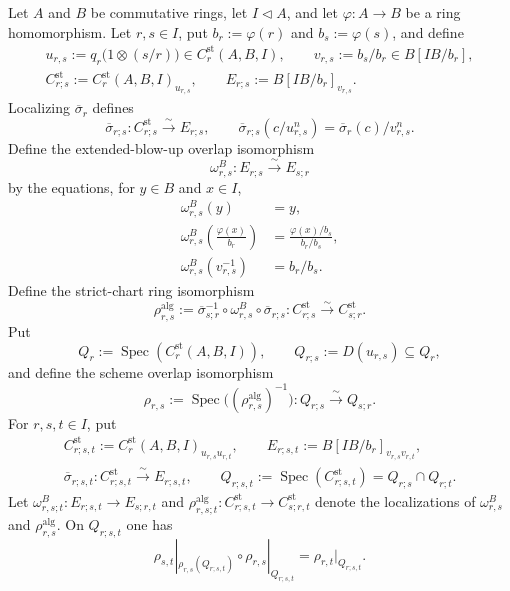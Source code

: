 \begin{lemma}
  \label{lemma:nagata-strict-transform-chart-cocycle}
  \lean{}

  Let $A$ and $B$ be commutative rings, let $I\triangleleft A$, and let
  \(\varphi\colon A\to B\) be a ring homomorphism.
  Let $r,s\in I$, put $b_r:=\varphi(r)$ and $b_s:=\varphi(s)$, and define
  \[
  \begin{gathered}
    u_{r,s}:=q_r\bigl(1\otimes(s/r)\bigr)
      \in C_r^{\mathrm{st}}(A,B,I),\qquad
    v_{r,s}:=b_s/b_r\in B[IB/b_r],\\
    C^{\mathrm{st}}_{r;s}:=
      C_r^{\mathrm{st}}(A,B,I)_{u_{r,s}},\qquad
    E_{r;s}:=B[IB/b_r]_{v_{r,s}}.
  \end{gathered}
  \]
  Localizing $\overline\sigma_r$ defines
  \[
    \overline\sigma_{r;s}\colon
      C^{\mathrm{st}}_{r;s}\xrightarrow{\sim}E_{r;s},
    \qquad
    \overline\sigma_{r;s}(c/u_{r,s}^n)
      =\overline\sigma_r(c)/v_{r,s}^n.
  \]
  Define the extended-blow-up overlap isomorphism
  \[
    \omega^B_{r,s}\colon E_{r;s}\xrightarrow{\sim}E_{s;r}
  \]
  by the equations, for $y\in B$ and $x\in I$,
  \[
  \begin{aligned}
    \omega^B_{r,s}(y)&=y,\\
    \omega^B_{r,s}\!\left(\frac{\varphi(x)}{b_r}\right)
      &=\frac{\varphi(x)/b_s}{b_r/b_s},\\
    \omega^B_{r,s}(v_{r,s}^{-1})&=b_r/b_s.
  \end{aligned}
  \]
  Define the strict-chart ring isomorphism
  \[
    \rho^{\mathrm{alg}}_{r,s}:=
      \overline\sigma_{s;r}^{-1}\circ\omega^B_{r,s}
        \circ\overline\sigma_{r;s}
      \colon C^{\mathrm{st}}_{r;s}\xrightarrow{\sim}
        C^{\mathrm{st}}_{s;r}.
  \]
  Put
  \[
    Q_r:=\operatorname{Spec}(C_r^{\mathrm{st}}(A,B,I)),\qquad
    Q_{r;s}:=D(u_{r,s})\subseteq Q_r,
  \]
  and define the scheme overlap isomorphism
  \[
    \rho_{r,s}:=
      \operatorname{Spec}\bigl((\rho^{\mathrm{alg}}_{r,s})^{-1}\bigr)
      \colon Q_{r;s}\xrightarrow{\sim}Q_{s;r}.
  \]
  For $r,s,t\in I$, put
  \[
  \begin{gathered}
    C^{\mathrm{st}}_{r;s,t}:=
      C_r^{\mathrm{st}}(A,B,I)_{u_{r,s}u_{r,t}},\qquad
    E_{r;s,t}:=B[IB/b_r]_{v_{r,s}v_{r,t}},\\
    \overline\sigma_{r;s,t}\colon
      C^{\mathrm{st}}_{r;s,t}\xrightarrow{\sim}E_{r;s,t},\qquad
    Q_{r;s,t}:=\operatorname{Spec}(C^{\mathrm{st}}_{r;s,t})
      =Q_{r;s}\cap Q_{r;t}.
  \end{gathered}
  \]
  Let $\omega^B_{r,s;t}\colon E_{r;s,t}\to E_{s;r,t}$ and
  $\rho^{\mathrm{alg}}_{r,s;t}\colon
    C^{\mathrm{st}}_{r;s,t}\to C^{\mathrm{st}}_{s;r,t}$ denote the
  localizations of $\omega^B_{r,s}$ and $\rho^{\mathrm{alg}}_{r,s}$.
  On $Q_{r;s,t}$ one has
  \[
    \rho_{s,t}|_{\rho_{r,s}(Q_{r;s,t})}\circ
      \rho_{r,s}|_{Q_{r;s,t}}
      =\rho_{r,t}|_{Q_{r;s,t}}.
  \]
\end{lemma}


